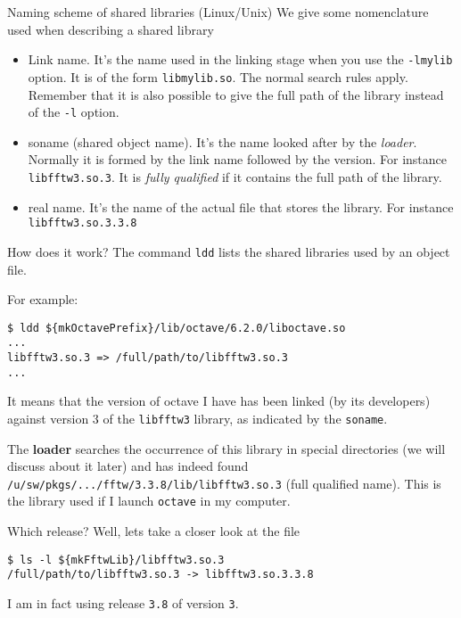 \documentclass[10pt]{beamer}
\begin{document}
\begin{frame}{Naming scheme of shared libraries (Linux/Unix)}
  We give some nomenclature used when describing a shared library

  \begin{itemize}
  \item Link name. It's the name used in the linking stage when
    you use the \texttt{-lmylib} option.  It is of the
    form \texttt{libmylib.so}. The normal search rules
    apply. Remember that it is also possible to give the full path of
    the library instead of the \texttt{-l} option.
  \item soname (shared object name).  It's the name looked after
    by the \emph{loader}.  Normally it is formed by the link name
    followed by the version.  For instance
    \texttt{libfftw3.so.3}. It is \emph{fully
    qualified} if it contains the full path of the library.
  \item real name. It's the name of the actual file that stores the library. 
    For instance \texttt{libfftw3.so.3.3.8}
  \end{itemize}
\end{frame}


\begin{frame}[fragile]{How does it work?}  The command
  \texttt{ldd} lists the shared libraries used by an object file.

  For example:
\begin{verbatim}
$ ldd ${mkOctavePrefix}/lib/octave/6.2.0/liboctave.so
...
libfftw3.so.3 => /full/path/to/libfftw3.so.3
...
\end{verbatim}
It means that the version of octave I have has been linked (by its
developers) against version $3$ of the \texttt{libfftw3} library, 
as indicated by the \texttt{soname}.

The \textbf{loader} searches the occurrence of this library in special
directories (we will discuss about it later) and has indeed found
\texttt{/u/sw/pkgs/.../fftw/3.3.8/lib/libfftw3.so.3} (full qualified name). This is the library used if I launch \texttt{octave} in my computer. \smallskip

Which release? Well, lets take a closer look at the file
\begin{verbatim}
$ ls -l ${mkFftwLib}/libfftw3.so.3
/full/path/to/libfftw3.so.3 -> libfftw3.so.3.3.8
\end{verbatim}
I am in fact using release \texttt{3.8} of version \texttt{3}.
\end{frame}
\end{document}

